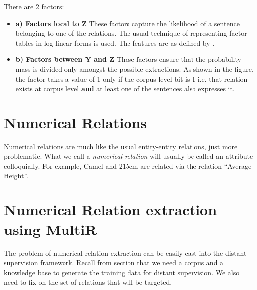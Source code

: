 \documentclass[a4paper,10pt]{article}
\begin{document}
There are 2 factors:
\begin{itemize}
\item \textbf{a) Factors local to Z} These factors capture the likelihood of a sentence belonging to one of the relations.
The usual technique of representing factor tables in log-linear forms is used. The features are as defined by 
\cite{mintz}.

\item \textbf{b) Factors between Y and Z} These factors ensure that the probability mass is divided only amongst the possible extractions.
As shown in the figure, the factor takes a value of 1 only if the corpus level bit is 1 i.e. that relation exists at corpus level \textbf{and} 
at least one of the sentences also expresses it.
\end{itemize}
  
  
\section{Numerical Relations}
Numerical relations are much like the usual entity-entity relations, just more problematic.
What we call a \emph{numerical relation} will usually be called an attribute colloquially. 
For example, Camel and 215cm are related via the relation ``Average Height''.

\section{Numerical Relation extraction using MultiR}
The problem of numerical relation extraction can be easily cast into the distant supervision framework.
Recall from section \cite{ds} that we need a corpus and a knowledge base to generate the training data for distant supervision.
We also need to fix on the set of relations that will be targeted. 
\end{document}

